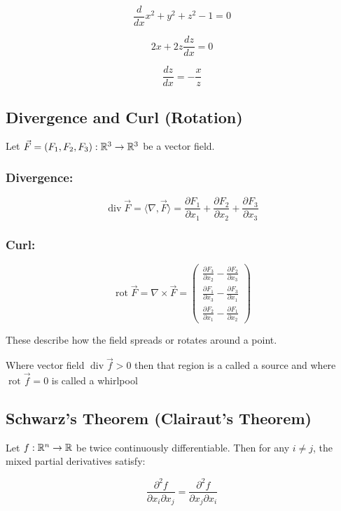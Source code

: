 \[
    \frac{d}{dx} x^2 + y^2 + z^2  -1 = 0
\]

\[
    2x + 2z \frac{dz}{dx}  = 0
\]

\[
    \frac{dz}{dx} = - \frac{x}{z}
\]

\subsection{Divergence and Curl (Rotation)}

Let \( \vec{F} = (F_1, F_2, F_3) : \mathbb{R}^3 \to \mathbb{R}^3 \) be a vector field.

\subsubsection{Divergence:}

\[
    \operatorname{div} \vec{F} = \langle\nabla, \vec{F}\rangle = \frac{\partial F_1}{\partial x_1} + 
    \frac{\partial F_2}{\partial x_2} + \frac{\partial F_3}{\partial x_3}
\]

\subsubsection{Curl:}

\[
    \operatorname{rot} \vec{F} = \nabla \times \vec{F} = \begin{pmatrix}
    \frac{\partial F_3}{\partial x_2} - \frac{\partial F_2}{\partial x_3} \\
    \frac{\partial F_1}{\partial x_3} - \frac{\partial F_3}{\partial x_1} \\
    \frac{\partial F_2}{\partial x_1} - \frac{\partial F_1}{\partial x_2}
    \end{pmatrix}
\]

These describe how the field spreads or rotates around a point.

Where vector field \( \operatorname{div}\vec{f} > 0\) then that region is a called a source
and where \(\operatorname{rot}\vec{f} = 0\) is called a whirlpool

\subsection{Schwarz’s Theorem (Clairaut’s Theorem)}

Let \( f : \mathbb{R}^n \to \mathbb{R} \) be twice continuously differentiable. Then for any \( i \ne j \), 
the mixed partial derivatives satisfy:

\[
    \frac{\partial^2 f}{\partial x_i \partial x_j} = \frac{\partial^2 f}{\partial x_j \partial x_i}
\]


